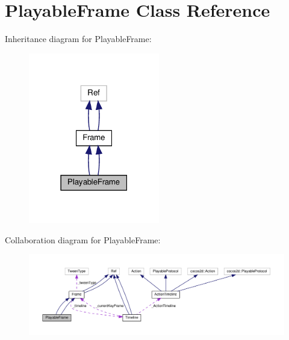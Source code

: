 \hypertarget{classPlayableFrame}{}\section{Playable\+Frame Class Reference}
\label{classPlayableFrame}


Inheritance diagram for Playable\+Frame\+:
\nopagebreak
\begin{figure}[H]
\begin{center}
\leavevmode
\includegraphics[width=162pt]{classPlayableFrame__inherit__graph}
\end{center}
\end{figure}


Collaboration diagram for Playable\+Frame\+:
\nopagebreak
\begin{figure}[H]
\begin{center}
\leavevmode
\includegraphics[width=350pt]{classPlayableFrame__coll__graph}
\end{center}
\end{figure}
